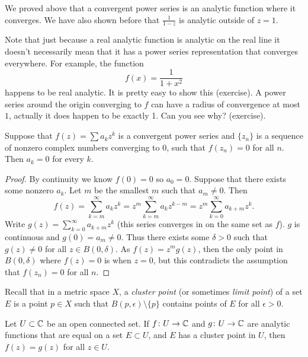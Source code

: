 We proved above that a convergent power series is an
analytic function where it converges.  We have also shown before that
$\frac{1}{1-z}$ is analytic outside of $z=1$.

Note that just because a real analytic function is analytic on the
real line it doesn't necessarily mean that it has a power series
representation that converges everywhere.  For example, the function
\begin{equation*}
f(x) = \frac{1}{1+x^2}
\end{equation*}
happens to be real analytic.  It is pretty easy to show this (exercise).  A power
series around the origin converging to $f$ can have a radius of convergence at most $1$,
actually it does happen to be exactly 1.  Can you see why? (exercise).

\begin{lemma}
Suppose that $f(z) = \sum a_k z^k$ is a convergent power series and
$\{ z_n \}$ is a sequence of nonzero complex numbers converging to 0,
such that $f(z_n) = 0$ for all $n$.  Then $a_k = 0$ for every $k$.
\end{lemma}

\begin{proof}
By continuity we know $f(0) = 0$ so $a_0 = 0$.
Suppose that there exists some nonzero $a_k$.
Let $m$ be the smallest $m$ such that $a_m \not= 0$.  Then
\begin{equation*}
f(z) = \sum_{k=m}^\infty a_k z^k = 
z^m \sum_{k=m}^\infty a_k z^{k-m} =
z^m \sum_{k=0}^\infty a_{k+m} z^{k} .
\end{equation*}
Write $g(z) = \sum_{k=0}^\infty a_{k+m} z^{k}$ (this series converges in
on the same set as $f$).  $g$ is continuous and $g(0) = a_m \not= 0$.  Thus
there exists some $\delta > 0$ such that $g(z) \not= 0$ for all $z \in
B(0,\delta)$.  As $f(z) = z^m g(z)$, then the only point in $B(0,\delta)$ where
$f(z) = 0$ is when $z=0$, but this contradicts the assumption
that $f(z_n) = 0$ for all $n$.
\end{proof}

Recall that in a metric space $X$, a \emph{cluster point}
(or sometimes \emph{limit point}) of a set
$E$ is a point $p \in X$ such that
$B(p,\epsilon) \setminus \{ p \}$ contains points of $E$
for all $\epsilon > 0$.

\begin{thm}
Let $U \subset {\mathbb{C}}$ be an open connected set.  If $f \colon U \to {\mathbb{C}}$
and $g \colon U \to {\mathbb{C}}$ are analytic functions that are
equal on a set $E \subset U$, and $E$ has a cluster point
in $U$, then $f(z) = g(z)$ for all $z \in U$.
\end{thm}

